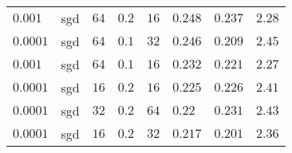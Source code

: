 \begin{table}[tbp]
\begin{tabular}{llllllll}
$0.001$ & sgd & $64$ & $0.2$ & $16$ & $0.248$ & $0.237$ & $2.28$ \\
$0.0001$ & sgd & $64$ & $0.1$ & $32$ & $0.246$ & $0.209$ & $2.45$ \\
$0.001$ & sgd & $64$ & $0.1$ & $16$ & $0.232$ & $0.221$ & $2.27$ \\
$0.0001$ & sgd & $16$ & $0.2$ & $16$ & $0.225$ & $0.226$ & $2.41$ \\
$0.0001$ & sgd & $32$ & $0.2$ & $64$ & $0.22$ & $0.231$ & $2.43$ \\
$0.0001$ & sgd & $16$ & $0.2$ & $32$ & $0.217$ & $0.201$ & $2.36$ \\
\hline
\end{tabular}
\end{table}

